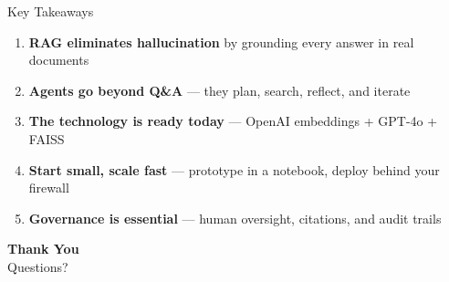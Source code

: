 \documentclass[aspectratio=169,12pt]{beamer}
\begin{document}

\begin{frame}{Key Takeaways}
  \begin{enumerate}
    \setlength\itemsep{12pt}
    \item \textbf{RAG eliminates hallucination} by grounding every answer in real documents
    \item \textbf{Agents go beyond Q\&A} --- they plan, search, reflect, and iterate
    \item \textbf{The technology is ready today} --- OpenAI embeddings + GPT-4o + FAISS
    \item \textbf{Start small, scale fast} --- prototype in a notebook, deploy behind your firewall
    \item \textbf{Governance is essential} --- human oversight, citations, and audit trails
  \end{enumerate}
\end{frame}

\begin{frame}[plain]
  \begin{center}
    \vspace{1.5cm}
    {\Huge\bfseries Thank You}\\[1cm]
    {\Large Questions?}\\[1.5cm]

  \end{center}
\end{frame}
\end{document}
